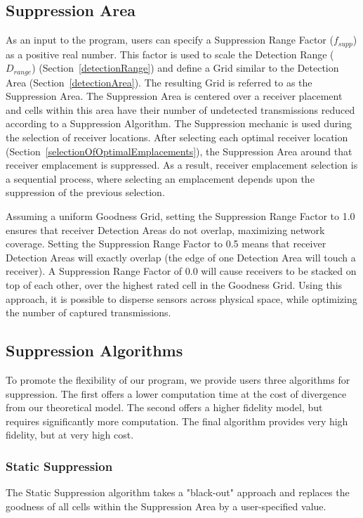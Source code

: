 \subsection{Suppression Area}
As an input to the program, users can specify a Suppression Range Factor ($f_{supp}$) as a positive real number.  This factor is used to scale the Detection Range ($D_{range}$) (Section~\ref{detectionRange}) and define a Grid similar to the Detection Area (Section~\ref{detectionArea}).  The resulting Grid is referred to as the Suppression Area.  The Suppression Area is centered over a receiver placement and cells within this area have their number of undetected transmissions reduced according to a Suppression Algorithm.  The Suppression mechanic is used during the selection of receiver locations.  After selecting each optimal receiver location (Section~\ref{selectionOfOptimalEmplacements}), the Suppression Area around that receiver emplacement is suppressed.  As a result, receiver emplacement selection is a sequential process, where selecting an emplacement depends upon the suppression of the previous selection.  

Assuming a uniform Goodness Grid, setting the Suppression Range Factor to 1.0 ensures  that receiver Detection Areas do not overlap, maximizing network coverage.  Setting the Suppression Range Factor to 0.5 means that receiver Detection Areas will exactly overlap (the edge of one Detection Area will touch a receiver).  A Suppression Range Factor of 0.0 will cause receivers to be stacked on top of each other, over the highest rated cell in the Goodness Grid.  Using this approach, it is possible to disperse sensors across physical space, while optimizing the number of captured transmissions.

\subsection{Suppression Algorithms}
\label{suppressionAlgorithms}
To promote the flexibility of our program, we provide users three algorithms for suppression.  The first offers a lower computation time at the cost of divergence from our theoretical model.  The second offers a higher fidelity model, but requires significantly more computation.  The final algorithm provides very high fidelity, but at very high cost.

\subsubsection{Static Suppression}
\label{staticSuppression}
The Static Suppression algorithm takes a "black-out" approach and replaces the goodness of all cells within the Suppression Area by a user-specified value.


